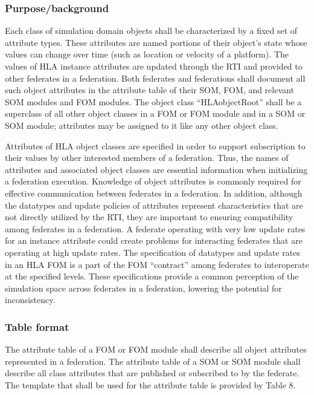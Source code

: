 \subsubsection{Purpose/background}
Each class of simulation domain objects shall be characterized by a fixed set of attribute types. These attributes are named portions of their object's state whose values can change over time (such as location or velocity of a platform). The values of HLA instance attributes are updated through the RTI and provided to other federates in a federation. Both federates and federations shall document all such object attributes in the attribute table of their SOM, FOM, and relevant SOM modules and FOM modules. The object class ``HLAobjectRoot'' shall be a superclass of all other object classes in a FOM or FOM module and in a SOM or SOM module; attributes may be assigned to it like any other object class.

Attributes of HLA object classes are specified in order to support subscription to their values by other interested members of a federation. Thus, the names of attributes and associated object classes are essential information when initializing a federation execution. Knowledge of object attributes is commonly required for effective communication between federates in a federation. In addition, although the datatypes and update policies of attributes represent characteristics that are not directly utilized by the RTI, they are important to ensuring compatibility among federates in a federation. A federate operating with very low update rates for an instance attribute could create problems for interacting federates that are operating at high update rates. The specification of datatypes and update rates in an HLA FOM is a part of the FOM ``contract'' among federates to interoperate at the specified levels. These specifications provide a common perception of the simulation space across federates in a federation, lowering the potential for inconsistency.

\subsubsection{Table format}
The attribute table of a FOM or FOM module shall describe all object attributes represented in a federation. The attribute table of a SOM or SOM module shall describe all class attributes that are published or subscribed to by the federate. The template that shall be used for the attribute table is provided by Table 8.
